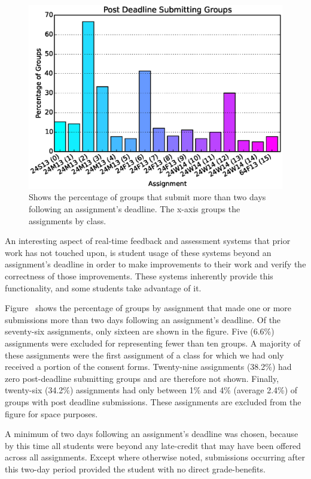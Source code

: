 \begin{figure}[!t]
\centering
\includegraphics[width=5.25in]{graphs/Post_Deadline_Submitting_Groups.eps}
\caption{Shows the percentage of groups that submit more than two days
  following an assignment's deadline. The x-axis groups the assignments by
  class.}
\end{figure}

An interesting aspect of real-time feedback and assessment systems that prior
work has not touched upon, is student usage of these systems beyond an
assignment's deadline in order to make improvements to their work and verify
the correctness of those improvements. These systems inherently provide this
functionality, and some students take advantage of it.

Figure~ shows the percentage of groups by assignment that
made one or more submissions more than two days following an assignment's
deadline. Of the seventy-six assignments, only sixteen are shown in the
figure. Five (6.6\%) assignments were excluded for representing fewer than ten
groups. A majority of these assignments were the first assignment of a class
for which we had only received a portion of the consent forms. Twenty-nine
assignments (38.2\%) had zero post-deadline submitting groups and are therefore
not shown. Finally, twenty-six (34.2\%) assignments had only between 1\% and
4\% (average 2.4\%) of groups with post deadline submissions. These assignments
are excluded from the figure for space purposes.

A minimum of two days following an assignment's deadline was chosen, because by
this time all students were beyond any late-credit that may have been offered
across all assignments. Except where otherwise noted, submissions occurring
after this two-day period provided the student with no direct grade-benefits.

